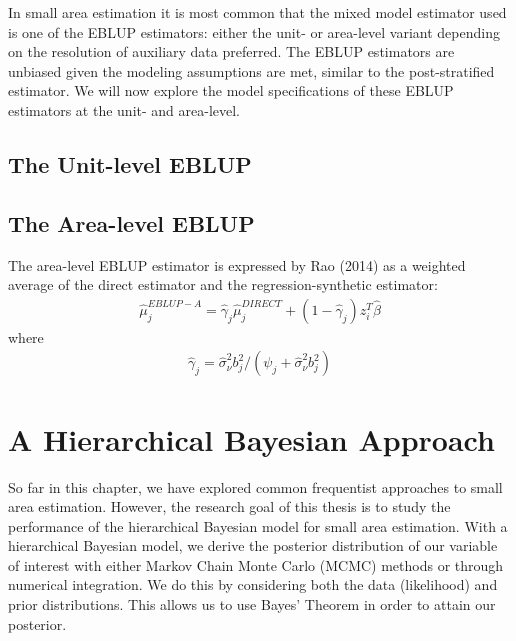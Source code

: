\documentclass[12pt,twoside]{reedthesis}
\begin{document}
In small area estimation it is most common that the mixed model estimator used is one of the EBLUP estimators: either the unit- or area-level variant depending on the resolution of auxiliary data preferred. The EBLUP estimators are unbiased given the modeling assumptions are met, similar to the post-stratified estimator. We will now explore the model specifications of these EBLUP estimators at the unit- and area-level.

\hypertarget{the-unit-level-eblup}{%
\subsection{The Unit-level EBLUP}\label{the-unit-level-eblup}}

\hypertarget{the-area-level-eblup}{%
\subsection{The Area-level EBLUP}\label{the-area-level-eblup}}

The area-level EBLUP estimator is expressed by Rao (2014) as a weighted average of the direct estimator and the regression-synthetic estimator:
\begin{align}
\hat \mu_j^{EBLUP-A} = \hat\gamma_j \hat\mu_j^{DIRECT} + (1 - \hat\gamma_j) z_i^T \hat\beta
\end{align}
where
\begin{align}
\hat \gamma_j = \hat \sigma_\nu^2 b_j^2 / (\psi_j + \hat\sigma_\nu^2 b_j^2)
\end{align}
\hypertarget{a-hierarchical-bayesian-approach}{%
\section{A Hierarchical Bayesian Approach}\label{a-hierarchical-bayesian-approach}}

So far in this chapter, we have explored common frequentist approaches to small area estimation. However, the research goal of this thesis is to study the performance of the hierarchical Bayesian model for small area estimation. With a hierarchical Bayesian model, we derive the posterior distribution of our variable of interest with either Markov Chain Monte Carlo (MCMC) methods or through numerical integration. We do this by considering both the data (likelihood) and prior distributions. This allows us to use Bayes' Theorem in order to attain our posterior.
\end{document}
